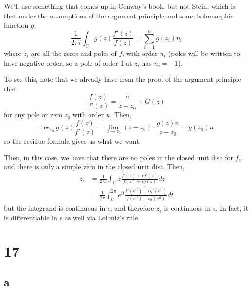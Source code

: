 \documentclass[12pt,letterpaper]{article}
\theoremstyle{definition}
\DeclareMathOperator{\res}{res}
\begin{document}

We'll use something that comes up in Conway's book, but not Stein, which is that under the assumptions of the argument principle and some holomorphic function $g$,
\[
  \frac{1}{2\pi i}\int_{C}g(z)\frac{f'(z)}{f(z)} = \sum_{i=1}^{n}g(z_{i})n_{i}
\]
where $z_{i}$ are all the zeros and poles of $f$, with order $n_{i}$ (poles will be written to have negative order, so a pole of order 1 at $z_{i}$ has $n_{i} = -1$).

To see this, note that we already have from the proof of the argument principle that
\[
  \frac{f(z)}{f'(z)} = \frac{n}{z - z_{0}} + G(z)
\]
for any pole or zero $z_{0}$ with order $n$. Then,
\[
  \res_{z_{0}}g(z)\frac{f(z)}{f'(z)} = \lim_{z \rightarrow z_{0}}(z-z_{0})\cdot \frac{g(z)n}{z - z_{0}} =  g(z_{0})n
\]
so the residue formula gives us what we want.

Then, in this case, we have that there are no poles in the closed unit disc for $f_{\epsilon}$, and there is only a simple zero in the closed unit disc. Then,
\begin{align*}
  z_{\epsilon} &= \frac{1}{2\pi i}\int_{C}z\frac{f'(z) + \epsilon g'(z)}{f(z) + \epsilon g(z)}dz \\
  &= \frac{1}{2\pi}\int_{0}^{2\pi}e^{it}\frac{f'(e^{i t}) + \epsilon g'(e^{i t})}{f(e^{i t}) + \epsilon g(e^{i t})}dt
\end{align*}
but the integrand is continuous in $\epsilon$, and therefore $z_{\epsilon}$ is continuous in $\epsilon$. In fact, it is differentiable in $\epsilon$ as well via Leibniz's rule.

\section*{17}

\subsection*{a}
\end{document}
